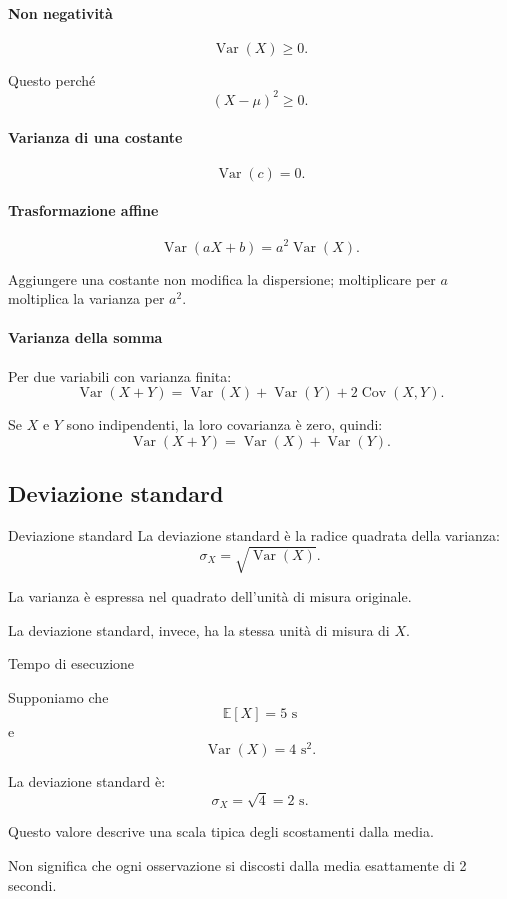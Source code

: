 \paragraph{Non negatività}
\[
\boxed{
\operatorname{Var}(X)\geq0.
}
\]

Questo perché
\[
(X-\mu)^2\geq0.
\]

\paragraph{Varianza di una costante}
\[
\operatorname{Var}(c)=0.
\]

\paragraph{Trasformazione affine}
\[
\boxed{
\operatorname{Var}(aX+b)
=
a^2\operatorname{Var}(X).
}
\]

Aggiungere una costante
non modifica la dispersione;
moltiplicare per $a$
moltiplica la varianza per $a^2$.

\paragraph{Varianza della somma}

Per due variabili con varianza finita:
\[
\boxed{
\operatorname{Var}(X+Y)
=
\operatorname{Var}(X)
+
\operatorname{Var}(Y)
+
2\operatorname{Cov}(X,Y).
}
\]

Se $X$ e $Y$ sono indipendenti,
la loro covarianza è zero,
quindi:
\[
\operatorname{Var}(X+Y)
=
\operatorname{Var}(X)
+
\operatorname{Var}(Y).
\]

\subsection{Deviazione standard}

\begin{definition}{Deviazione standard}
La deviazione standard
è la radice quadrata
della varianza:
\[
\boxed{
\sigma_X
=
\sqrt{\operatorname{Var}(X)}.
}
\]
\end{definition}

La varianza è espressa nel quadrato
dell'unità di misura originale.

La deviazione standard,
invece, ha la stessa
unità di misura di $X$.

\begin{example}{Tempo di esecuzione}

Supponiamo che
\[
\mathbb{E}[X]=5\text{ s}
\]
e
\[
\operatorname{Var}(X)=4\text{ s}^2.
\]

La deviazione standard è:
\[
\sigma_X=\sqrt4=2\text{ s}.
\]

Questo valore descrive una scala
tipica degli scostamenti dalla media.

Non significa che ogni osservazione
si discosti dalla media
esattamente di 2 secondi.
\end{example}

